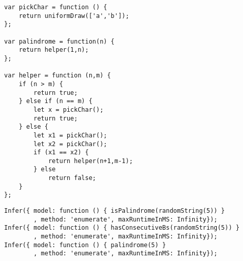 \begin{verbatim}
var pickChar = function () {
    return uniformDraw(['a','b']);
};

var palindrome = function(n) {
    return helper(1,n);
};

var helper = function (n,m) {
    if (n > m) {
        return true;
    } else if (n == m) {
        let x = pickChar();
        return true;
    } else {
        let x1 = pickChar();
        let x2 = pickChar();
        if (x1 == x2) {
            return helper(n+1,m-1);
        } else
            return false;
    }
};
\end{verbatim}

\begin{verbatim}
Infer({ model: function () { isPalindrome(randomString(5)) }
        , method: 'enumerate', maxRuntimeInMS: Infinity});
Infer({ model: function () { hasConsecutiveBs(randomString(5)) }
        , method: 'enumerate', maxRuntimeInMS: Infinity});
Infer({ model: function () { palindrome(5) }
        , method: 'enumerate', maxRuntimeInMS: Infinity});
\end{verbatim}


